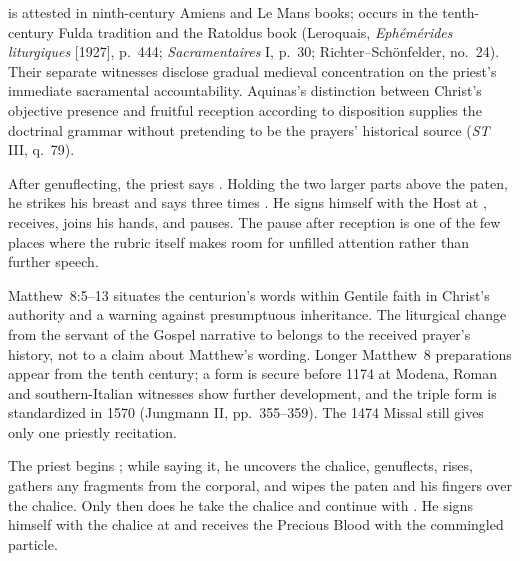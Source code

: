  is attested in ninth-century Amiens and Le Mans books;  occurs in the tenth-century Fulda tradition and the Ratoldus book (Leroquais, \emph{Eph\'em\'erides liturgiques} [1927], p.~444; \emph{Sacramentaires} I, p.~30; Richter--Sch\"onfelder, no.~24). Their separate witnesses disclose gradual medieval concentration on the priest's immediate sacramental accountability. Aquinas's distinction between Christ's objective presence and fruitful reception according to disposition supplies the doctrinal grammar without pretending to be the prayers' historical source (\emph{ST} III, q.~79).


After genuflecting, the priest says . Holding the two larger parts above the paten, he strikes his breast and says three times . He signs himself with the Host at , receives, joins his hands, and pauses. The pause after reception is one of the few places where the rubric itself makes room for unfilled attention rather than further speech.

Matthew~8:5--13 situates the centurion's words within Gentile faith in Christ's authority and a warning against presumptuous inheritance. The liturgical change from the servant of the Gospel narrative to  belongs to the received prayer's history, not to a claim about Matthew's wording. Longer Matthew~8 preparations appear from the tenth century; a  form is secure before 1174 at Modena, Roman and southern-Italian witnesses show further development, and the triple  form is standardized in 1570 (Jungmann II, pp.~355--359). The 1474 Missal still gives only one priestly recitation.

The priest begins ; while saying it, he uncovers the chalice, genuflects, rises, gathers any fragments from the corporal, and wipes the paten and his fingers over the chalice. Only then does he take the chalice and continue with . He signs himself with the chalice at  and receives the Precious Blood with the commingled particle.

